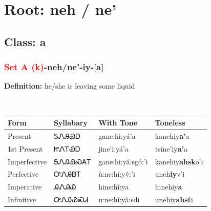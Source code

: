 \needspace{4in}
\section*{Root: neh / ne'}
\nopagebreak
{}
\needspace{3in}
\subsection*{Class: a}
\nopagebreak
\needspace{2in}
\subsubsection*{\textcolor{Red}{Set A (k)}{-}\textbf{neh/ne'}{-}iy{-}[a]}
\nopagebreak
\textbf{Definition: } he/she is leaving some liquid
\\[0.5em]
\begin{tabularx}{\textwidth}{l X X X}%
\toprule%
\textbf{Form}&\textbf{Syllabary}&\textbf{With Tone}&\textbf{Toneless}\\%
\midrule%
Present&ᎦᏁᎯᏯᎠ&gane:hi:yá’a&kanehiy\textbf{a'}a\\%
1st Present&ᏥᏁᎢᏯᎠ&jine’i:yá’a&tsine'iy\textbf{a'}a\\%
Imperfective&ᎦᏁᎯᏯᏍᎪᎢ&gane:hi:yâ:sgó:’i&kanehiy\textbf{ahsk}o'i\\%
Perfective&ᎤᏁᎯᏴᎢ&ù:ne:hí:yv̌:’i&uneh\textbf{iy}v'i\\%
Imperative&ᎯᏁᎯᏯ&hine:hǐ:ya&hinehiy\textbf{a}\\%
Infinitive&ᎤᏁᎯᏯᏍᏗ&u:ne:hǐ:yâ:sdi&unehiy\textbf{ahst}i\\%
\bottomrule%
\end{tabularx}
\\[1em]